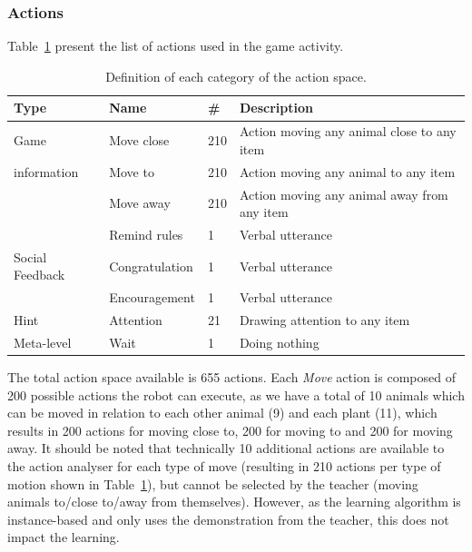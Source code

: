 
\subsubsection{Actions}

Table~\ref{tab:tuto_actions_space} present the list of actions used in the game activity.

\begin{table}[ht]
	\centering
	\caption{Definition of each category of the action space.}
	\label{tab:tuto_actions_space}
	\begin{tabularx}{\textwidth}{@{}lllX@{}}\toprule
		Type & Name & \# & Description \\
		\midrule
		Game & Move close & 210 &  Action moving any animal close to any item\\
		information & Move to & 210 & Action moving any animal to any item\\
		& Move away & 210 & Action moving any animal away from any item\\
		& Remind rules & 1 & Verbal utterance\\
		Social Feedback & Congratulation & 1 & Verbal utterance\\
		& Encouragement & 1 & Verbal utterance\\
		Hint & Attention & 21 & Drawing attention to any item\\
		Meta-level & Wait & 1 & Doing nothing\\
		\bottomrule
	\end{tabularx}
\end{table}

The total action space available is 655 actions. Each \emph{Move} action is composed of 200 possible actions the robot can execute, as we have a total of 10 animals which can be moved in relation to each other animal (9) and each plant (11), which results in 200 actions for moving close to, 200 for moving to and 200 for moving away. It should be noted that technically 10 additional actions are available to the action analyser for each type of move (resulting in 210 actions per type of motion shown in Table~\ref{tab:tuto_actions_space}), but cannot be selected by the teacher (moving animals to/close to/away from themselves). However, as the learning algorithm is instance-based and only uses the demonstration from the teacher, this does not impact the learning. 

